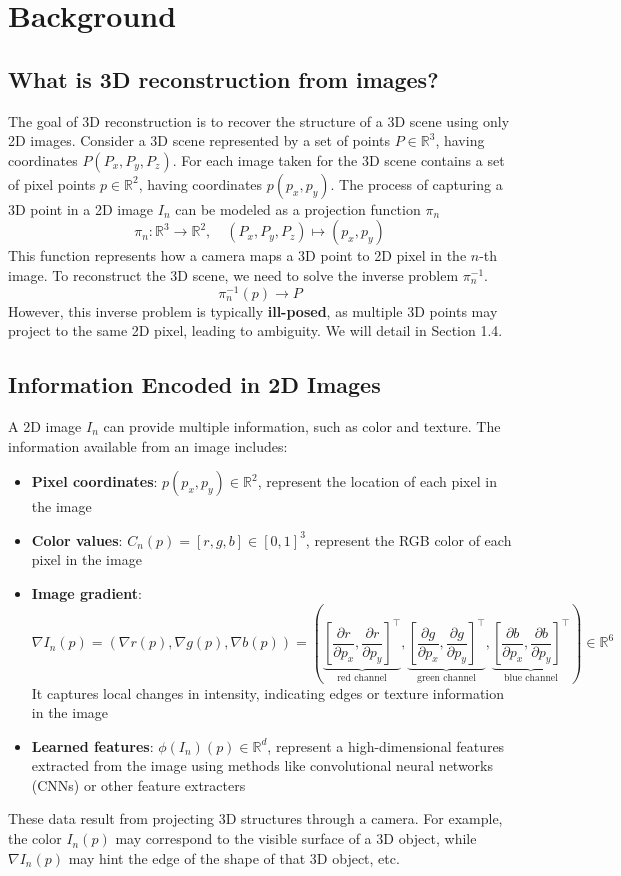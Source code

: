 \documentclass[12pt]{article}
\begin{document}
\section{Background}
\subsection{What is 3D reconstruction from images?}

The goal of 3D reconstruction is to recover the structure of a 3D scene using only 2D images.
Consider a 3D scene represented by a set of points $P \in \mathbb{R}^3$, having coordinates $P(P_x,P_y,P_z)$.
For each image taken for the 3D scene contains a set of pixel points $p \in \mathbb{R}^2$, having coordinates $p(p_x,p_y)$.
The process of capturing a 3D point in a 2D image $I_n$ can be modeled as a projection function $\pi_n$
\[
\pi_n: \mathbb{R}^3 \to \mathbb{R}^2, \quad (P_x, P_y, P_z) \mapsto (p_x, p_y)
\]
This function represents how a camera maps a 3D point to 2D pixel in the $n$-th image.
To reconstruct the 3D scene, we need to solve the inverse problem $\pi_n^{-1}$.
\[
\pi_n^{-1}(p) \to P
\]
However, this inverse problem is typically \textbf{ill-posed}, as multiple 3D points may project to the same 2D pixel, leading to ambiguity. We will detail in Section 1.4. 

\subsection{Information Encoded in 2D Images}
A 2D image $I_n$ can provide multiple information, such as color and texture. 
The information available from an image includes:
\begin{itemize}
    \item   \textbf{Pixel coordinates}: $p(p_x,p_y) \in \mathbb{R}^2$, represent the location of each pixel in the image
    \item   \textbf{Color values}: $C_n(p) = [r,g,b] \in [0,1]^3$, represent the RGB color of each pixel in the image
    \item   \textbf{Image gradient}: 
                \[
                \nabla I_n(p) = \left( \nabla r(p), \nabla g(p), \nabla b(p) \right) = \left( \underbrace{\left[ \frac{\partial r}{\partial p_x}, \frac{\partial r}{\partial p_y} \right]^\top}_{\text{red channel}}, \underbrace{\left[ \frac{\partial g}{\partial p_x}, \frac{\partial g}{\partial p_y} \right]^\top}_{\text{green channel}}, \underbrace{\left[ \frac{\partial b}{\partial p_x}, \frac{\partial b}{\partial p_y} \right]^\top}_{\text{blue channel}} \right) \in \mathbb{R}^6
                \]
            It captures local changes in intensity, indicating edges or texture information in the image
    \item   \textbf{Learned features}: $\phi(I_n)(p) \in \mathbb{R}^d$, represent a high-dimensional features extracted from the image using methods like convolutional neural networks (CNNs) or other feature extracters
\end{itemize}
These data result from projecting 3D structures through a camera. For example, the color $I_n(p)$ may correspond to the visible surface of a 3D object, while $\nabla I_n(p)$ may hint the edge of the shape of that 3D object, etc.
\end{document}
